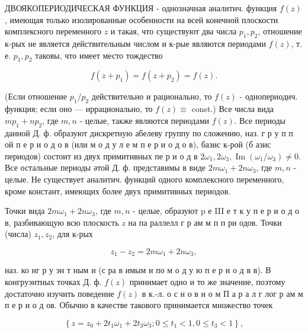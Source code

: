 \documentclass[10pt]{article}
\begin{document}
ДВОЯКОПЕРИОДИЧЕСКАЯ ФУНКЦИЯ - однозначная аналитич. функция $f(z)$, имеющая только изолированные особенности на всей конечной плоскости комплексного переменного $z$ и такая, что существуют два числа $p_{1}, p_{2}$, отношение к-рых не является действительным числом и к-рые являются периодами $f(z)$, т. е. $p_{1}, p_{2}$ таковы, что имеет место тождество



\[

f\left(z+p_{1}\right)=f\left(z+p_{2}\right)=f(z) .

\]



(Если отношение $p_{1} / p_{2}$ действительно и рационально, то $f(z)$ - однопериодич. функция; если оно — иррационально, то $f(z) \equiv$ const.) Все числа вида $m p_{1}+n p_{2}$, где $m, n$ - целые, также являются периодами $f(z)$. Все периоды данной Д. ф. образуют дискретную абелеву группу по сложению, наз. г р у п п ой п е р и о д о в (или м о д у л е м п е р и о д о в), базис к-рой (б азис периодов) состоит из двух примитивных пе р и о д в $2 \omega_{1}, 2 \omega_{3}, \operatorname{Im}\left(\omega_{1} / \omega_{3}\right) \neq 0$. Все остальные периоды әтой Д. ф. представимы в виде $2 m \omega_{1}+2 n \omega_{3}$, где $m, n$ - целые. Не существует аналитич. функций одного комплексного переменного, кроме констант, имеющих более двух примитивных периодов.



Точки вида $2 m \omega_{1}+2 n \omega_{3}$, где $m, n$ - целые, образуют p е III е т к у п е р и о д о в, разбивающую всю плоскость $z$ на па раллелл г р ам м п п ри одов. Точки (числа) $z_{1}, z_{2}$, для к-рых



\[

z_{1}-z_{2}=2 m \omega_{1}+2 n \omega_{3},

\]



наз. ко нг р у эн т ным и (с ра в имым и по м о д у ю п е р и о д в в). В конгруэнтных точках Д. ф. $f(z)$ принимает одно и то же значение, поэтому достаточно изучить поведение $f(z)$ в к.-л. о с н о в н о м П а р а л г лог р ам м п е р и о д ов. Обычно в качестве такового принимается множество точек



\[

\left\{z=z_{0}+2 t_{1} \omega_{1}+2 t_{3} \omega_{3} ; 0 \leqslant t_{1}<1,0 \leqslant t_{3}<1\right\},

\]
\end{document}
